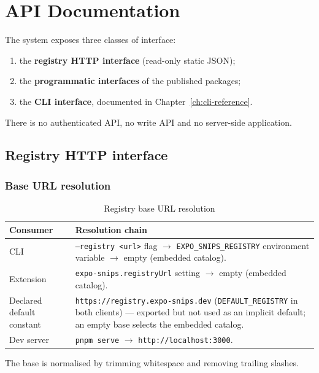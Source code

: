 \chapter{API Documentation}
\label{ch:api-documentation}

The system exposes three classes of interface:

\begin{enumerate}
  \item the \textbf{registry HTTP interface} (read-only static JSON);
  \item the \textbf{programmatic interfaces} of the published packages;
  \item the \textbf{CLI interface}, documented in Chapter~\ref{ch:cli-reference}.
\end{enumerate}

There is no authenticated API, no write API and no server-side application.

\section{Registry HTTP interface}

\subsection*{Base URL resolution}

\begin{longtable}{p{4.2cm}p{10cm}}
\caption{Registry base URL resolution}\\
\toprule
\textbf{Consumer} & \textbf{Resolution chain} \\
\midrule

CLI & \texttt{--registry <url>} flag $\rightarrow$ \texttt{EXPO\_SNIPS\_REGISTRY}
environment variable $\rightarrow$ empty (embedded catalog). \\
Extension & \texttt{expo-snips.registryUrl} setting $\rightarrow$ empty (embedded
catalog). \\
Declared default constant & \texttt{https://registry.expo-snips.dev}
(\texttt{DEFAULT\_REGISTRY} in both clients) --- exported but not used as an
implicit default; an empty base selects the embedded catalog. \\
Dev server & \texttt{pnpm serve} $\rightarrow$ \texttt{http://localhost:3000}. \\
\bottomrule
\end{longtable}

The base is normalised by trimming whitespace and removing trailing slashes.

